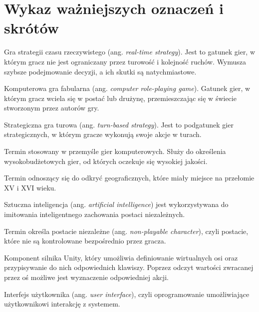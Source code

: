 \chapter*{Wykaz ważniejszych oznaczeń i skrótów}
\begin{description}[style=multiline,leftmargin=3cm]
\item[RTS] Gra strategii czasu rzeczywistego (ang. \textit{real-time strategy}). Jest to gatunek gier, w którym gracz nie jest
ograniczany przez turowość i kolejność ruchów. Wymusza szybsze podejmowanie decyzji, a ich skutki są natychmiastowe.
\item[cRPG] Komputerowa gra fabularna (ang. \textit{computer role-playing game}). Gatunek gier, w którym gracz wciela
się w postać lub drużynę, przemieszczając się w świecie stworzonym przez autorów gry.
\item[TBS] Strategiczna gra turowa (ang. \textit{turn-based strategy}). Jest to podgatunek gier strategicznych, w którym
gracze wykonują swoje akcje w turach.
\item[AAA (Triple-A)] Termin stosowany w przemyśle gier komputerowych. Służy do określenia wysokobudżetowych gier, od
których oczekuje się wysokiej jakości.
\item[Wielkie odkrycia geograficzne] Termin odnoszący się do odkryć geograficznych, które miały miejsce na przełomie XV
i XVI wieku.
\item[AI] Sztuczna inteligencja (ang. \textit{artificial intelligence}) jest wykorzystywana do imitowania inteligentnego
zachowania postaci niezależnych.
\item[NPC] Termin określa postacie niezależne (ang. \textit{non-playable character}), czyli postacie, które nie są kontrolowane bezpośrednio
przez gracza.
\item[Input Manager] Komponent silnika Unity, który umożliwia definiowanie wirtualnych osi oraz przypisywanie do nich
odpowiednich klawiszy. Poprzez odczyt wartości zwracanej przez oś możliwe jest wyznaczenie odpowiedniej akcji.
\item[UI] Interfejs użytkownika (ang. \textit{user interface}), czyli oprogramowanie umożliwiające użytkownikowi
interakcję z systemem.
\end{description}
